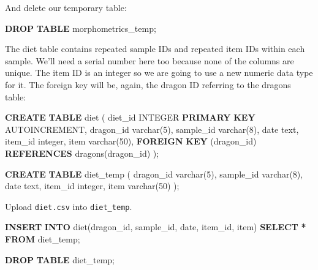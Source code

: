 \documentclass[
]{book}
\newenvironment{Shaded}{\begin{snugshade}}{\end{snugshade}}
\newcommand{\DataTypeTok}[1]{\textcolor[rgb]{0.13,0.29,0.53}{#1}}
\newcommand{\DecValTok}[1]{\textcolor[rgb]{0.00,0.00,0.81}{#1}}
\newcommand{\KeywordTok}[1]{\textcolor[rgb]{0.13,0.29,0.53}{\textbf{#1}}}
\newcommand{\NormalTok}[1]{#1}
\newcommand{\OperatorTok}[1]{\textcolor[rgb]{0.81,0.36,0.00}{\textbf{#1}}}
\begin{document}
And delete our temporary table:

\begin{Shaded}
\begin{Highlighting}[]
\KeywordTok{DROP} \KeywordTok{TABLE}\NormalTok{ morphometrics\_temp;}
\end{Highlighting}
\end{Shaded}

The diet table contains repeated sample IDs and repeated item IDs within each
sample. We'll need a serial number here too because none of the columns are
unique. The item ID is an integer so we are going to use a new numeric data type
for it. The foreign key will be, again, the dragon ID referring to the dragons
table:

\begin{Shaded}
\begin{Highlighting}[]
\KeywordTok{CREATE} \KeywordTok{TABLE}\NormalTok{ diet (}
\NormalTok{diet\_id }\DataTypeTok{INTEGER} \KeywordTok{PRIMARY} \KeywordTok{KEY}\NormalTok{ AUTOINCREMENT,}
\NormalTok{dragon\_id }\DataTypeTok{varchar}\NormalTok{(}\DecValTok{5}\NormalTok{),}
\NormalTok{sample\_id }\DataTypeTok{varchar}\NormalTok{(}\DecValTok{8}\NormalTok{),}
\DataTypeTok{date}\NormalTok{ text,}
\NormalTok{item\_id }\DataTypeTok{integer}\NormalTok{,}
\NormalTok{item }\DataTypeTok{varchar}\NormalTok{(}\DecValTok{50}\NormalTok{),}
\KeywordTok{FOREIGN} \KeywordTok{KEY}\NormalTok{ (dragon\_id) }\KeywordTok{REFERENCES}\NormalTok{ dragons(dragon\_id)}
\NormalTok{);}

\KeywordTok{CREATE} \KeywordTok{TABLE}\NormalTok{ diet\_temp (}
\NormalTok{dragon\_id }\DataTypeTok{varchar}\NormalTok{(}\DecValTok{5}\NormalTok{),}
\NormalTok{sample\_id }\DataTypeTok{varchar}\NormalTok{(}\DecValTok{8}\NormalTok{),}
\DataTypeTok{date}\NormalTok{ text,}
\NormalTok{item\_id }\DataTypeTok{integer}\NormalTok{,}
\NormalTok{item }\DataTypeTok{varchar}\NormalTok{(}\DecValTok{50}\NormalTok{)}
\NormalTok{);}
\end{Highlighting}
\end{Shaded}

Upload \texttt{diet.csv} into \texttt{diet\_temp}.

\begin{Shaded}
\begin{Highlighting}[]
\KeywordTok{INSERT} \KeywordTok{INTO}\NormalTok{ diet(dragon\_id, sample\_id, }\DataTypeTok{date}\NormalTok{, item\_id, item) }
\KeywordTok{SELECT} \OperatorTok{*} \KeywordTok{FROM}\NormalTok{ diet\_temp;}

\KeywordTok{DROP} \KeywordTok{TABLE}\NormalTok{ diet\_temp;}
\end{Highlighting}
\end{Shaded}
\end{document}
